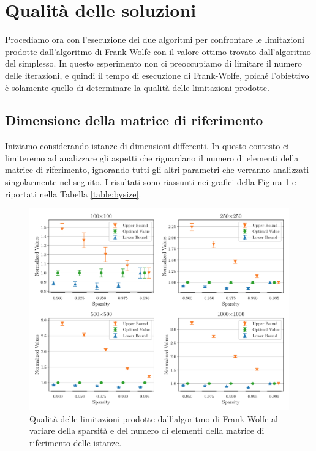 \section{Qualità delle soluzioni}
Procediamo ora con l'esecuzione dei due algoritmi per confrontare le limitazioni prodotte dall'algoritmo di Frank-Wolfe
con il valore ottimo trovato dall'algoritmo del simplesso. In questo esperimento non ci preoccupiamo di
limitare il numero delle iterazioni, e quindi il tempo di esecuzione di Frank-Wolfe, poiché l'obiettivo è solamente quello
di determinare la qualità delle limitazioni prodotte.

\subsection{Dimensione della matrice di riferimento}
Iniziamo considerando istanze di dimensioni differenti. In questo contesto ci limiteremo ad analizzare gli aspetti che
riguardano il numero di elementi della matrice di riferimento, ignorando tutti gli altri parametri che verranno
analizzati singolarmente nel seguito. I risultati sono riassunti nei grafici della Figura \ref{fig:bysize} e riportati
nella Tabella \ref{table:bysize}.
\begin{figure}[ht]
    \centering
    \includegraphics[width=\textwidth]{assets/figures/size.pdf}
    \caption{Qualità delle limitazioni prodotte dall'algoritmo di Frank-Wolfe al variare della sparsità e del numero di elementi della
    matrice di riferimento delle istanze.}
    \label{fig:bysize}
\end{figure}

